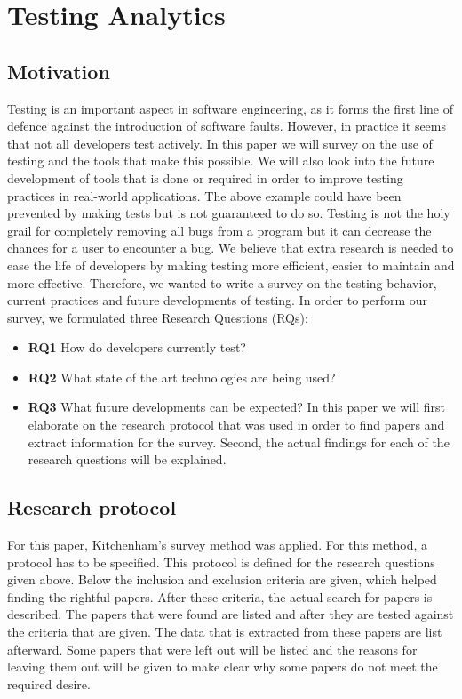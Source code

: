 \documentclass[]{book}
\providecommand{\tightlist}{%
  \setlength{\itemsep}{0pt}\setlength{\parskip}{0pt}}
\begin{document}
\chapter{Testing Analytics}\label{testing-analytics}

\section{Motivation}\label{motivation}

Testing is an important aspect in software engineering, as it forms the
first line of defence against the introduction of software
faults\cite{pinto2012understanding}. However, in practice it seems that
not all developers test actively. In this paper we will survey on the
use of testing and the tools that make this possible. We will also look
into the future development of tools that is done or required in order
to improve testing practices in real-world applications. The above
example could have been prevented by making tests but is not guaranteed
to do so. Testing is not the holy grail for completely removing all bugs
from a program but it can decrease the chances for a user to encounter a
bug. We believe that extra research is needed to ease the life of
developers by making testing more efficient, easier to maintain and more
effective. Therefore, we wanted to write a survey on the testing
behavior, current practices and future developments of testing. In order
to perform our survey, we formulated three Research Questions (RQs):

\begin{itemize}
\tightlist
\item
  \textbf{RQ1} How do developers currently test?
\item
  \textbf{RQ2} What state of the art technologies are being used?
\item
  \textbf{RQ3} What future developments can be expected? In this paper
  we will first elaborate on the research protocol that was used in
  order to find papers and extract information for the survey. Second,
  the actual findings for each of the research questions will be
  explained.
\end{itemize}

\section{Research protocol}\label{research-protocol}

For this paper, Kitchenham's survey method was applied. For this method,
a protocol has to be specified. This protocol is defined for the
research questions given above. Below the inclusion and exclusion
criteria are given, which helped finding the rightful papers. After
these criteria, the actual search for papers is described. The papers
that were found are listed and after they are tested against the
criteria that are given. The data that is extracted from these papers
are list afterward. Some papers that were left out will be listed and
the reasons for leaving them out will be given to make clear why some
papers do not meet the required desire.
\end{document}
